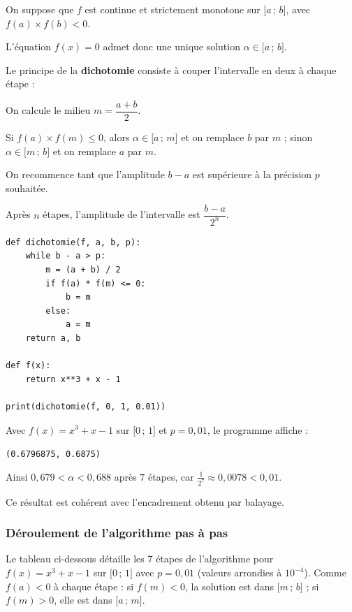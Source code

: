 \documentclass[11pt,a4paper]{article}
\newcommand{\intff}[2]{\mathopen{[}#1\,;\,#2\mathclose{]}}
\begin{document}
On suppose que $f$ est continue et strictement monotone sur $\intff{a}{b}$, avec
$f(a)\times f(b)<0$.

L'équation $f(x)=0$ admet donc une unique solution $\alpha\in\intff{a}{b}$.

Le principe de la \textbf{dichotomie} consiste à couper l'intervalle en deux à
chaque étape :
\begin{etapes}
  \item On calcule le milieu $m=\dfrac{a+b}{2}$.
  \item Si $f(a)\times f(m)\leqslant 0$, alors $\alpha\in\intff{a}{m}$ et on
        remplace $b$ par $m$ ; sinon $\alpha\in\intff{m}{b}$ et on remplace $a$
        par $m$.
  \item On recommence tant que l'amplitude $b-a$ est supérieure à la précision
        $p$ souhaitée.
\end{etapes}
Après $n$ étapes, l'amplitude de l'intervalle est $\dfrac{b-a}{2^n}$.

\begin{minipage}[c]{0.52\linewidth}
\begin{lstlisting}
def dichotomie(f, a, b, p):
    while b - a > p:
        m = (a + b) / 2
        if f(a) * f(m) <= 0:
            b = m
        else:
            a = m
    return a, b

def f(x):
    return x**3 + x - 1

print(dichotomie(f, 0, 1, 0.01))
\end{lstlisting}
\end{minipage}\hfill
\begin{minipage}[c]{0.45\linewidth}
\begin{exemple}[unbreakable]{}{}
Avec $f(x)=x^3+x-1$ sur $\intff{0}{1}$ et $p=0{,}01$, le programme affiche :
\begin{center}
\texttt{(0.6796875, 0.6875)}
\end{center}
Ainsi $0{,}679<\alpha<0{,}688$ après $7$ étapes, car
$\frac{1}{2^7}\approx 0{,}0078<0{,}01$.

Ce résultat est cohérent avec l'encadrement obtenu par balayage.
\end{exemple}
\end{minipage}

\subsubsection{Déroulement de l'algorithme pas à pas}

Le tableau ci-dessous détaille les $7$ étapes de l'algorithme pour
$f(x)=x^3+x-1$ sur $\intff{0}{1}$ avec $p=0{,}01$
(valeurs arrondies à $10^{-4}$). Comme $f(a)<0$ à chaque étape : si $f(m)<0$,
la solution est dans $\intff{m}{b}$ ; si $f(m)>0$, elle est dans $\intff{a}{m}$.
\end{document}
